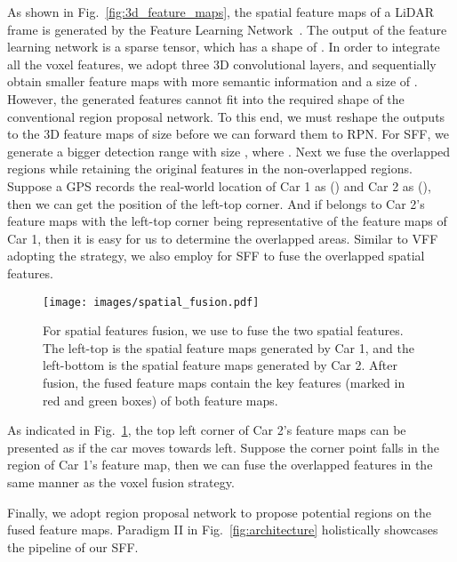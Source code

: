 \documentclass[sigconf]{acmart}
\begin{document}
As shown in Fig.~\ref{fig:3d_feature_maps}, the spatial feature maps of a LiDAR frame is generated by the Feature Learning Network~\cite{zhou2018voxelnet}. 
The output of the feature learning network is a sparse tensor, which has a shape of . In order to integrate all the voxel features, we adopt three 3D convolutional layers, and sequentially obtain smaller feature maps with more semantic information and a size of . However, the generated features cannot fit into the required shape of the conventional region proposal network. To this end, we must reshape the outputs to the 3D feature maps of size  before we can forward them to RPN.
For SFF, we generate a bigger detection range with size , where . Next we fuse the overlapped regions while retaining the original features in the non-overlapped regions. Suppose a GPS records the real-world location of Car 1 as () and Car 2 as (), then we can get the position of the left-top corner. And if  belongs to Car 2's feature maps with the left-top corner being representative of the feature maps of Car 1, then it is easy for us to determine the overlapped areas. Similar to VFF adopting the  strategy, we also employ  for SFF to fuse the overlapped spatial features.  


\begin{figure}[!htbp]
    \centering
    \texttt{[image: images/spatial\_fusion.pdf]}
    \vspace{-7pt}
    \caption{For spatial features fusion, we use  to fuse the two spatial features. The left-top is the spatial feature maps generated by Car 1, and the left-bottom is the spatial feature maps generated by Car 2. After fusion, the fused feature maps contain the key features (marked in red and green boxes) of both feature maps.  }
    \vspace{-11pt}
    \label{fig:spatial_fusion}
\end{figure}

As indicated in Fig.~\ref{fig:spatial_fusion}, the top left corner of Car 2's feature maps can be presented as  if the car moves towards left.  Suppose the corner point falls in the region of Car 1's feature map, then we can fuse the overlapped features in the same manner as the voxel fusion strategy.  

Finally, we adopt region proposal network to propose potential regions on the fused feature maps. Paradigm II in Fig.~\ref{fig:architecture} holistically showcases the pipeline of our SFF.
\end{document}
